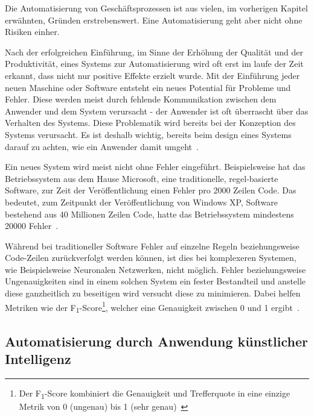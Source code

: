 
Die Automatisierung von Geschäftsprozessen ist aus vielen, im vorherigen Kapitel erwähnten, Gründen erstrebenswert. Eine Automatisierung geht aber nicht ohne Risiken einher.


Nach der erfolgreichen Einführung, im Sinne der Erhöhung der Qualität und der Produktivität, eines Systems zur Automatisierung wird oft erst im laufe der Zeit erkannt, dass nicht nur positive Effekte erzielt wurde. Mit der Einführung jeder neuen Maschine oder Software entsteht ein neues Potential für Probleme und Fehler. Diese werden meist durch fehlende Kommunikation zwischen dem Anwender und dem System verursacht - der Anwender ist oft überrascht über das Verhalten des Systems. Diese Problematik wird bereits bei der Konzeption des Systems verursacht. Es ist deshalb wichtig, bereits beim design eines Systems darauf zu achten, wie ein Anwender damit umgeht~\autocite{Sarter1997}. 

Ein neues System wird meist nicht ohne Fehler eingeführt. Beispielsweise hat das Betriebssystem aus dem Hause Microsoft, eine traditionelle, regel-basierte Software, zur Zeit der Veröffentlichung einen Fehler pro 2000 Zeilen Code. Das bedeutet, zum Zeitpunkt der Veröffentlichung von Windows XP, Software bestehend aus 40 Millionen Zeilen Code, hatte das Betriebssystem mindestens 20000 Fehler~\autocite{TheEconomist2010}. 

Während bei traditioneller Software Fehler auf einzelne Regeln beziehungsweise Code-Zeilen zurückverfolgt werden können, ist dies bei komplexeren Systemen, wie Beispielsweise Neuronalen Netzwerken, nicht möglich. Fehler beziehungsweise Ungenauigkeiten sind in einem solchen System ein fester Bestandteil und anstelle diese ganzheitlich zu beseitigen wird versucht diese zu minimieren. Dabei helfen Metriken wie der F\textsubscript{1}-Score\footnote{Der F\textsubscript{1}-Score kombiniert die Genauigkeit und Trefferquote in eine einzige Metrik von 0 (ungenau) bis 1 (sehr genau)~\autocite{VanRijsbergen1979}}, welcher eine Genauigkeit zwischen 0 und 1 ergibt~\autocite{VanRijsbergen1979}.

\subsection{Automatisierung durch Anwendung künstlicher Intelligenz}

